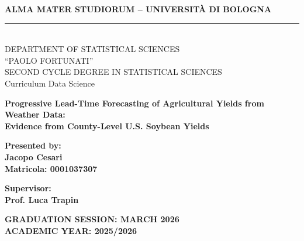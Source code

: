 \documentclass[12pt,a4paper]{report}
\begin{document}
\hypersetup{pageanchor=false}
\begin{titlepage}
    \begin{center}
        {\Large{\bf ALMA MATER STUDIORUM -- UNIVERSIT\`A DI BOLOGNA}} \\
        \vspace{0.5cm}
        \rule[0.1mm]{15cm}{0.1mm}\\
        {\Large DEPARTMENT OF STATISTICAL SCIENCES\\ ``PAOLO FORTUNATI''} \\
        \vspace{0.3cm}
        {\Large SECOND CYCLE DEGREE IN STATISTICAL SCIENCES} \\
        \vspace{0.2cm}
        {\large Curriculum Data Science}
        
        \vspace{25mm}
        
        {\LARGE{\bf Progressive Lead-Time Forecasting of Agricultural Yields from Weather Data:}} \\[0.4cm]
        {\Large{\bf Evidence from County-Level U.S. Soybean Yields}}
    \end{center}
    
    \vspace{30mm}
    \par
    \noindent
    \begin{minipage}[t]{0.47\textwidth}
        {\large{\bf Presented by:\\
        Jacopo Cesari \\
        Matricola: 0001037307}}
    \end{minipage}
    \hfill
    \begin{minipage}[t]{0.47\textwidth}\raggedleft
        {\large{\bf Supervisor:\\
        Prof. Luca Trapin}}
    \end{minipage}
    
    \vspace{25mm}
    \begin{center}
        {\large{\bf GRADUATION SESSION: MARCH 2026}} \\
        \vspace{8mm}
        {\large{\bf ACADEMIC YEAR: 2025/2026}}
    \end{center}
\end{titlepage}
\end{document}
